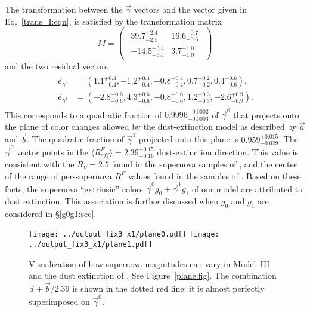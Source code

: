 \documentclass[trackchanges]{aastex61}   	%
\begin{document}
{The transformation between the $\vec{\gamma}$  vectors and the    vector given in
Eq.~\ref{trans_I:eqn}, is satisfied by the transformation matrix
\begin{equation}
M=
\begin{pmatrix}
\begin{array}{rr}
39.7^{+2.4}_{-2.5} & 16.6^{+0.7}_{-0.6} \\
-14.5^{+3.4}_{-3.4} & 3.7^{+1.0}_{-1.0}
\end{array}
\end{pmatrix} 
\end{equation}
and the two residual vectors
\begin{align}
\begin{split}
\vec{\epsilon}_{\gamma^0} &=\left(1.1^{+0.4}_{-0.4} , -1.2^{+0.4}_{-0.4} , -0.8^{+0.4}_{-0.4} , 0.7^{+0.2}_{-0.2} , 0.4^{+0.6}_{-0.6}\right), \\
\vec{\epsilon}_{\gamma^1} & =\left(-2.8^{+0.6}_{-0.6} , 4.3^{+0.6}_{-0.6} , -0.8^{+0.6}_{-0.6} , 1.2^{+0.3}_{-0.3} , -2.6^{+0.9}_{-0.9}\right).
\end{split}
\label{res_3:eqn}
\end{align}
This corresponds to a quadratic fraction of $0.9996^{+0.0002}_{-0.0003}$ of $\vec{\gamma}^0$ that projects onto the plane of
color changes allowed by the  dust-extinction model
as described by
$\vec{a}$ and $\vec{b}$. The quadratic fraction of $\vec{\gamma}^1$ projected
onto this plane is
$0.959^{+0.015}_{-0.029}$.
The   $\vec{\gamma}^0$  vector points in the $\langle R^F_{\mathit{eff}}\rangle=2.39^{+0.15}_{-0.16}$ dust-extinction direction.
This value is consistent with the $R_V=2.5$ found in the supernova samples of \citet{2011ApJ...729...55F}, and the
center  of the range of per-supernova $R^F$ values found in the samples of \citet{2014ApJ...789...32B, 2015MNRAS.453.3300A}.
Based on these facts, the supernova ``extrinsic'' colors $\vec{\gamma}^0 g_0 + \vec{\gamma}^1 g_1$  of our model are attributed to dust extinction.
This association is further discussed when $g_0$ and $g_1$ are considered in \S\ref{g0g1:sec}.

\begin{figure}[htbp] %
   \centering
   \texttt{[image: ../output\_fix3\_x1/plane0.pdf]}
   \texttt{[image: ../output\_fix3\_x1/plane1.pdf]}
   \caption{
   Visualization of how supernova magnitudes can vary in Model~III and the dust extinction of .
   See Figure~\ref{plane:fig}.
   The combination $\vec{a}+\vec{b}/2.39$ is shown in the dotted red
   line: it is almost perfectly superimposed on $\vec{\gamma}^0$.
   \label{plane3:fig}}
\end{figure}


}
\end{document}
